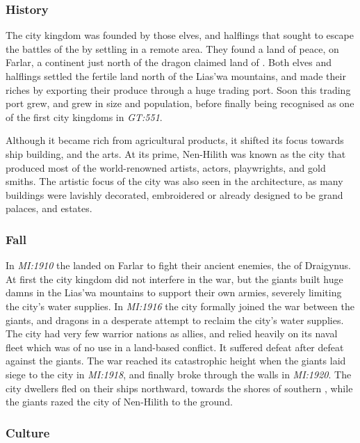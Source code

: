 \subsubsection{History}

The city kingdom was founded by those elves, and halflings that sought to
escape the battles of the  by settling in a remote area.
They found a land of peace, on Farlar, a continent just north of the dragon
claimed land of . Both elves and halflings settled
the fertile land north of the Lias'wa mountains, and made their riches by
exporting their produce through a huge trading port. Soon this trading port
grew, and grew in size and population, before finally being recognised as
one of the first city kingdoms in \emph{GT:551}.

Although it became rich from agricultural products, it shifted its focus
towards ship building, and the arts. At its prime, Nen-Hilith was known as the
city that produced most of the world-renowned artists, actors, playwrights,
and gold smiths. The artistic focus of the city was also seen in the
architecture, as many buildings were lavishly decorated, embroidered or
already designed to be grand palaces, and estates.

\subsubsection{Fall}

In \emph{MI:1910} the  landed on Farlar to fight their
ancient enemies, the  of Draigynus. At first the city
kingdom did not interfere in the war, but the giants built huge damns in
the Lias'wa mountains to support their own armies, severely limiting the
city's water supplies. In \emph{MI:1916} the city formally joined the war
between the giants, and dragons in a desperate attempt to reclaim the city's
water supplies. The city had very few warrior nations as allies, and
relied heavily on its naval fleet which was of no use in a land-based
conflict. It suffered defeat after defeat against the giants. The war reached
its catastrophic height when the giants laid siege to the city in
\emph{MI:1918}, and finally broke through the walls in \emph{MI:1920}. The
city dwellers fled on their ships northward, towards the shores of southern
, while the giants razed the city of Nen-Hilith to the
ground.

\subsubsection{Culture}

